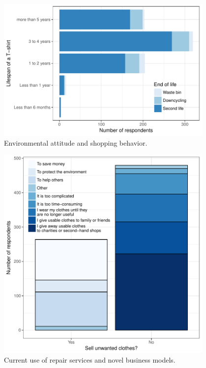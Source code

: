 \documentclass[review]{elsarticle}
\begin{document}
\begin{figure}[ht]
\begin{center}
 \includegraphics[width=0.95\textwidth]{figures/EndOfLife.pdf}
 \caption{Environmental attitude and shopping behavior.}\label{fig:EndOfLife}
 \end{center}
\end{figure}
\begin{figure}[ht]
\begin{center}
 \includegraphics[width=0.95\textwidth]{figures/Sell2ndhand.pdf}
 \caption{Current use of repair services and novel business models.}\label{fig:Sell2ndhand}
 \end{center}
\end{figure}
\end{document}
